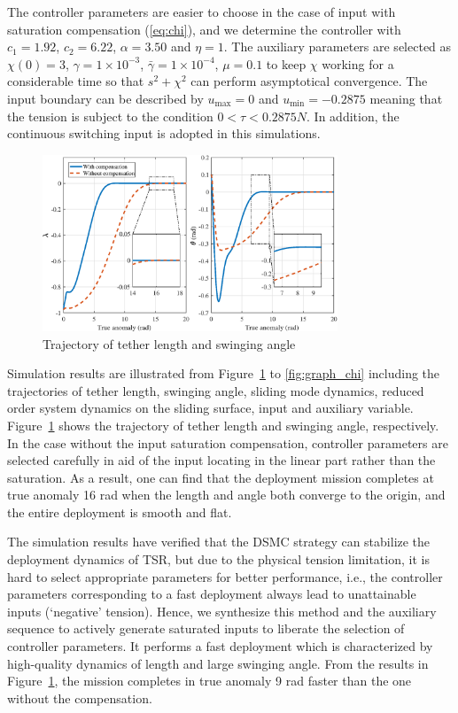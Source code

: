 \documentclass[10pt,onecolumn,draftcls]{IEEEtran}
\begin{document}
The controller parameters are easier to choose in the case of input with saturation compensation (\ref{eq:chi}), and we determine the controller with $c_1=1.92$, $c_2=6.22$, $\alpha=3.50$ and $\eta=1$. The auxiliary parameters are selected as $\chi(0) = 3$, $\gamma = 1\times 10^{-3}$, $\bar\gamma = 1\times 10^{-4}$, $\mu=0.1$ to keep $\chi$ working for a considerable time so that $s^2+\chi^2$ can perform asymptotical convergence. The input boundary can be described by $u_{\max} = 0$ and $u_{\min} = -0.2875$ meaning that the tension is subject to the condition $0<\tau<0.2875 N$.
In addition, the continuous switching input is adopted in this simulations.

\begin{figure}[htbp]
\centering
\includegraphics[width=250pt]{tether.eps}
\caption{Trajectory of tether length and swinging angle} \label{fig:graph_tether}
\end{figure}

Simulation results are illustrated from Figure~\ref{fig:graph_tether} to \ref{fig:graph_chi} including the trajectories of tether length, swinging angle, sliding mode dynamics, reduced order  system dynamics on the sliding surface, input and auxiliary variable. Figure~\ref{fig:graph_tether} shows the trajectory of tether length and swinging angle, respectively. In the case without the input saturation compensation, controller parameters are selected carefully in aid of the input locating in the linear part rather than the saturation. As a result, one can find that the deployment mission completes at true anomaly 16 rad when the length and angle both converge to the origin, and the entire deployment is smooth and flat. 

The simulation results have verified that the DSMC strategy can stabilize the deployment dynamics of TSR, but due to the physical tension limitation, it is hard to select appropriate parameters for better performance, i.e., the controller parameters corresponding to a fast deployment always lead to unattainable inputs (`negative' tension). Hence, we synthesize this method and the auxiliary sequence to actively generate saturated inputs to liberate the selection of controller parameters. It performs a fast deployment which is characterized by high-quality dynamics of length and large swinging angle. From the results in Figure~\ref{fig:graph_tether}, the mission completes in true anomaly 9 rad faster than the one without the compensation. 
\end{document}
